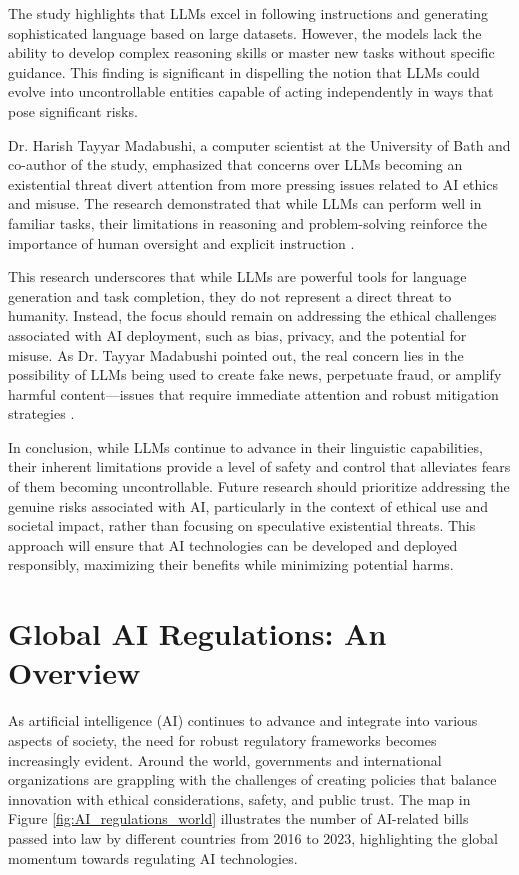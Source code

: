 The study highlights that LLMs excel in following instructions and generating sophisticated language based on large datasets. However, the models lack the ability to develop complex reasoning skills or master new tasks without specific guidance. This finding is significant in dispelling the notion that LLMs could evolve into uncontrollable entities capable of acting independently in ways that pose significant risks.

Dr. Harish Tayyar Madabushi, a computer scientist at the University of Bath and co-author of the study, emphasized that concerns over LLMs becoming an existential threat divert attention from more pressing issues related to AI ethics and misuse. The research demonstrated that while LLMs can perform well in familiar tasks, their limitations in reasoning and problem-solving reinforce the importance of human oversight and explicit instruction \cite{bath2024ai}.

This research underscores that while LLMs are powerful tools for language generation and task completion, they do not represent a direct threat to humanity. Instead, the focus should remain on addressing the ethical challenges associated with AI deployment, such as bias, privacy, and the potential for misuse. As Dr. Tayyar Madabushi pointed out, the real concern lies in the possibility of LLMs being used to create fake news, perpetuate fraud, or amplify harmful content—issues that require immediate attention and robust mitigation strategies \cite{lu2023emergent}.

In conclusion, while LLMs continue to advance in their linguistic capabilities, their inherent limitations provide a level of safety and control that alleviates fears of them becoming uncontrollable. Future research should prioritize addressing the genuine risks associated with AI, particularly in the context of ethical use and societal impact, rather than focusing on speculative existential threats. This approach will ensure that AI technologies can be developed and deployed responsibly, maximizing their benefits while minimizing potential harms.

\section{Global AI Regulations: An Overview}

As artificial intelligence (AI) continues to advance and integrate into various aspects of society, the need for robust regulatory frameworks becomes increasingly evident. Around the world, governments and international organizations are grappling with the challenges of creating policies that balance innovation with ethical considerations, safety, and public trust. The map in Figure \ref{fig:AI_regulations_world} illustrates the number of AI-related bills passed into law by different countries from 2016 to 2023, highlighting the global momentum towards regulating AI technologies.

